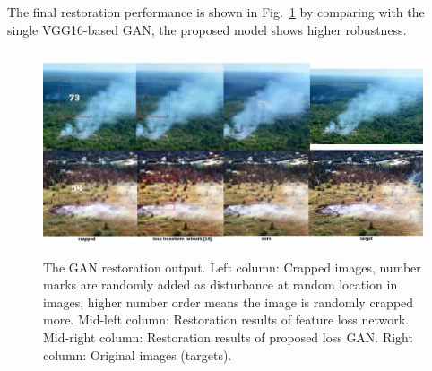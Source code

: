  The final restoration performance is shown in Fig.~\ref{fig:GANoutcompare} by comparing with the single VGG16-based GAN, the proposed model shows higher robustness.
\begin{figure}[ht]
\centering
\includegraphics[height=60mm]{figs/GANoutcompare.pdf}
\caption{The GAN restoration output. Left column: Crapped images, number marks are randomly added as disturbance at random location in images, higher number order means the image is randomly crapped more. Mid-left column: Restoration results of feature loss network. Mid-right column: Restoration results of proposed loss GAN. Right column: Original images (targets).}
\label{fig:GANoutcompare}
\end{figure}\par

